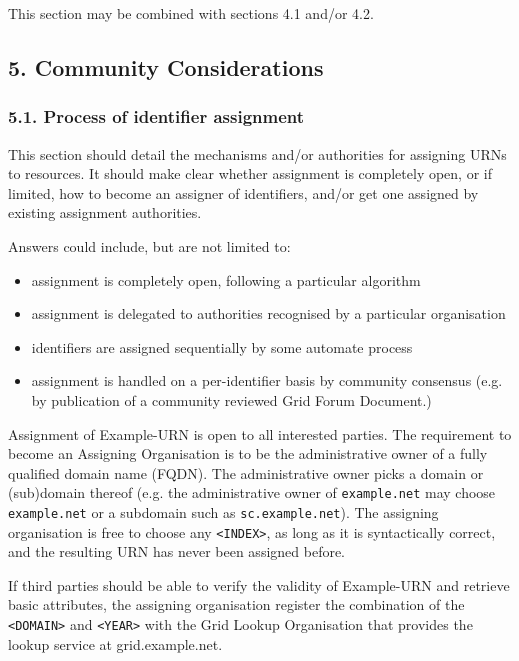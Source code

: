 \documentclass[12pt]{article}  %
\begin{document}
This section may be combined with sections 4.1 and/or 4.2.

\subsection*{5. Community Considerations}

\subsubsection*{5.1. Process of identifier assignment}

This section should detail the mechanisms and/or authorities for
assigning URNs to resources.  It should make clear whether
assignment is completely open, or if limited, how to become an
assigner of identifiers, and/or get one assigned by existing
assignment authorities.

Answers could include, but are not limited to:
\begin{itemize}
    \item assignment is completely open, following a particular algorithm
    \item assignment is delegated to authorities recognised by a particular 
      organisation
    \item identifiers are assigned sequentially by some automate process
    \item assignment is handled on a per-identifier basis by community consensus 
      (e.g. by publication of a community reviewed Grid Forum Document.)
\end{itemize}

\begin{example}
Assignment of Example-URN is open to all interested parties. The requirement 
to become an Assigning Organisation is to be the administrative owner of a fully 
qualified domain name (FQDN). The administrative owner picks a domain or 
(sub)domain thereof (e.g. the administrative owner of \texttt{example.net} 
may choose \texttt{example.net} or a subdomain such as \texttt{sc.example.net}). 
The assigning organisation is free to choose any \texttt{<INDEX>}, as long as 
it is syntactically correct, and the resulting URN has never been assigned 
before.

If third parties should be able to verify the validity of Example-URN 
and retrieve basic attributes, the assigning organisation \MUST{} register the 
combination of the \texttt{<DOMAIN>} and \texttt{<YEAR>} with the Grid Lookup 
Organisation that provides the lookup service at grid.example.net.
\end{example}
\end{document}
